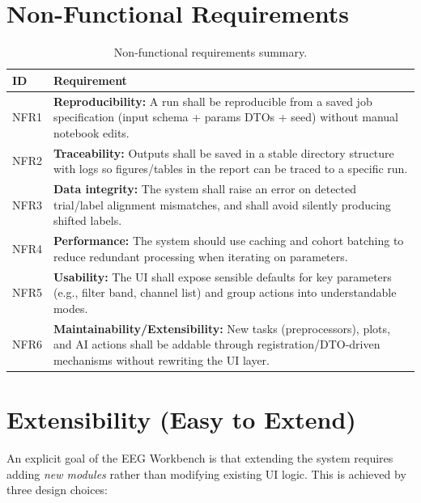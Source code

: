 \section{Non-Functional Requirements}
\label{sec:nonfunctional-requirements}

\begin{table}[H]
\centering
\begin{tabularx}{\textwidth}{|l|X|}
\hline
\textbf{ID} & \textbf{Requirement} \\
\hline
NFR1 & \textbf{Reproducibility:} A run shall be reproducible from a saved job specification (input schema + params DTOs + seed) without manual notebook edits. \\
\hline
NFR2 & \textbf{Traceability:} Outputs shall be saved in a stable directory structure with logs so figures/tables in the report can be traced to a specific run. \\
\hline
NFR3 & \textbf{Data integrity:} The system shall raise an error on detected trial/label alignment mismatches, and shall avoid silently producing shifted labels. \\
\hline
NFR4 & \textbf{Performance:} The system should use caching and cohort batching to reduce redundant processing when iterating on parameters. \\
\hline
NFR5 & \textbf{Usability:} The UI shall expose sensible defaults for key parameters (e.g., filter band, channel list) and group actions into understandable modes. \\
\hline
NFR6 & \textbf{Maintainability/Extensibility:} New tasks (preprocessors), plots, and AI actions shall be addable through registration/DTO-driven mechanisms without rewriting the UI layer. \\
\hline
\end{tabularx}
\caption{Non-functional requirements summary.}
\label{tab:nfr-summary}
\end{table}

\section{Extensibility (Easy to Extend)}
\label{sec:extensibility}

An explicit goal of the EEG Workbench is that extending the system requires adding \textit{new modules} rather than modifying existing UI logic. This is achieved by three design choices:

